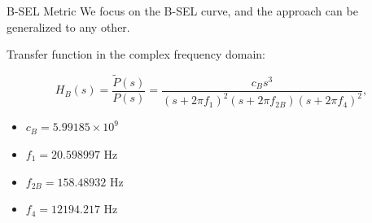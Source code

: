 \documentclass{beamer}
\newcounter{sectionframecount}
\begin{document}
\begin{frame}[t]{B-SEL Metric}
\vspace{-10pt}
We focus on the B-SEL curve, and the approach can be generalized to any other.

\vspace{10pt}
Transfer function in the complex frequency domain:

\begin{equation}
  H_B(s) =\dfrac{\tilde{P}(s)}{P(s)} = \dfrac{c_B s^3}{(s+2\pi f_1)^2(s+2\pi f_{2B})(s+2\pi f_4)^2},
  \label{e:continuous_transfer}
\end{equation}

\vspace{10pt}
\begin{itemize}
  \item $c_B = 5.99185 \times 10^9$
  \item $f_1 = 20.598997$ Hz
  \item $f_{2B} = 158.48932$ Hz
  \item $f_4 = 12194.217$ Hz
\end{itemize}


\end{frame}

\end{document}
